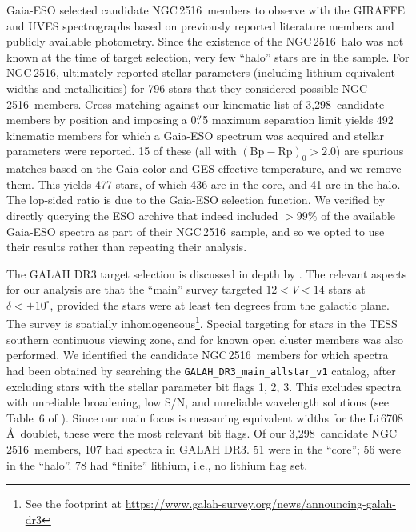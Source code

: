 \documentclass[12pt,twocolumn,tighten]{aastex63}
\newcommand{\cn}{NGC\,2516} %
\newcommand{\nkinematic}{3{,}298} %
\newcommand{\bpmrp}{(\mathrm{Bp}-\mathrm{Rp})_0}
\begin{document}
Gaia-ESO selected candidate \cn\ members to observe with the GIRAFFE
and UVES spectrographs based on previously reported literature members
and publicly available photometry.  Since the existence of the \cn\
halo was not known at the time of target selection, very few ``halo''
stars are in the sample.  For \cn, \citet{randich_gaiaeso_2018}
ultimately reported stellar parameters (including lithium equivalent
widths and metallicities) for 796 stars that they considered possible
\cn\ members.  Cross-matching against our kinematic list of
\nkinematic\ candidate members by position and imposing a 0$\mbox{$.\!\!^{\prime\prime}$}$5
maximum separation limit yields 492 kinematic members for which a
Gaia-ESO spectrum was acquired and stellar parameters were reported.
15 of these (all with $\bpmrp > 2.0$) are spurious matches based on
the Gaia color and GES effective temperature, and we remove them.
This yields 477 stars, of which 436 are in the core, and 41 are in the
halo.  The lop-sided ratio is due to the Gaia-ESO selection function.
We verified by directly querying the ESO archive that
\citet{randich_gaiaeso_2018} indeed included $>99\%$ of the available
Gaia-ESO spectra as part of their \cn\ sample, and so we opted to use
their results rather than repeating their analysis.

The GALAH DR3 target selection is discussed in depth by
\citet{buder_galah_2020}.  The relevant aspects for our analysis are
that the ``main'' survey targeted $12<V<14$ stars at
$\delta<+10^\circ$, provided the stars were at least ten degrees from
the galactic plane.  The survey is spatially
inhomogeneous\footnote{See the footprint at
\url{https://www.galah-survey.org/news/announcing-galah-dr3}}. Special
targeting for stars in the TESS southern continuous viewing zone, and
for known open cluster members was also performed.  We identified the
candidate \cn\ members for which spectra had been obtained by
searching the \texttt{GALAH\_DR3\_main\_allstar\_v1} catalog, after
excluding stars with the stellar parameter bit flags 1, 2, 3.  This
excludes spectra with unreliable broadening, low S/N, and unreliable
wavelength solutions (see Table~6 of \citealt{buder_galah_2020}).
Since our main focus is measuring equivalent widths for the
Li\,6708\,\AA\ doublet, these were the most relevant bit flags.  Of
our \nkinematic\ candidate \cn\ members, 107 had spectra in GALAH DR3.
51 were in the ``core''; 56 were in the ``halo''.  78 had ``finite''
lithium, i.e., no lithium flag set.

%
%
\end{document}
